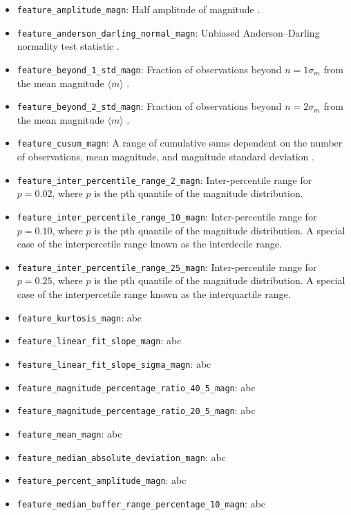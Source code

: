 \documentclass[twocolumn]{aastex63}
\begin{document}
\begin{itemize}
    \item \texttt{feature\_amplitude\_magn}: Half amplitude of magnitude \citep{Malanchev2021}.
    \item \texttt{feature\_anderson\_darling\_normal\_magn}: Unbiased Anderson–Darling normality test statistic \citep{Malanchev2021}.
    \item \texttt{feature\_beyond\_1\_std\_magn}: Fraction of observations beyond $n=1 \sigma_{m}$ from the mean magnitude $\langle m \rangle$ \citep{D'Isanto2016}.
    \item \texttt{feature\_beyond\_2\_std\_magn}: Fraction of observations beyond $n=2 \sigma_{m}$ from the mean magnitude $\langle m \rangle$ \citep{D'Isanto2016}.
    \item \texttt{feature\_cusum\_magn}: A range of cumulative sums dependent on the number of observations, mean magnitude, and magnitude standard deviation \citep{Kim2014}.
    \item \texttt{feature\_inter\_percentile\_range\_2\_magn}: Inter-percentile range for $p=0.02$, where $p$ is the pth quantile of the magnitude distribution.
    \item \texttt{feature\_inter\_percentile\_range\_10\_magn}: Inter-percentile range for $p=0.10$, where $p$ is the pth quantile of the magnitude distribution. A special case of the interpercetile range known as the interdecile range.
    \item \texttt{feature\_inter\_percentile\_range\_25\_magn}: Inter-percentile range for $p=0.25$, where $p$ is the pth quantile of the magnitude distribution. A special case of the interpercetile range known as the interquartile range.
    \item \texttt{feature\_kurtosis\_magn}: abc
    \item \texttt{feature\_linear\_fit\_slope\_magn}: abc
    \item \texttt{feature\_linear\_fit\_slope\_sigma\_magn}: abc
    \item \texttt{feature\_magnitude\_percentage\_ratio\_40\_5\_magn}: abc
    \item \texttt{feature\_magnitude\_percentage\_ratio\_20\_5\_magn}: abc
    \item \texttt{feature\_mean\_magn}: abc
    \item \texttt{feature\_median\_absolute\_deviation\_magn}: abc
    \item \texttt{feature\_percent\_amplitude\_magn}: abc
    \item \texttt{feature\_median\_buffer\_range\_percentage\_10\_magn}: abc

\end{itemize}
\end{document}
